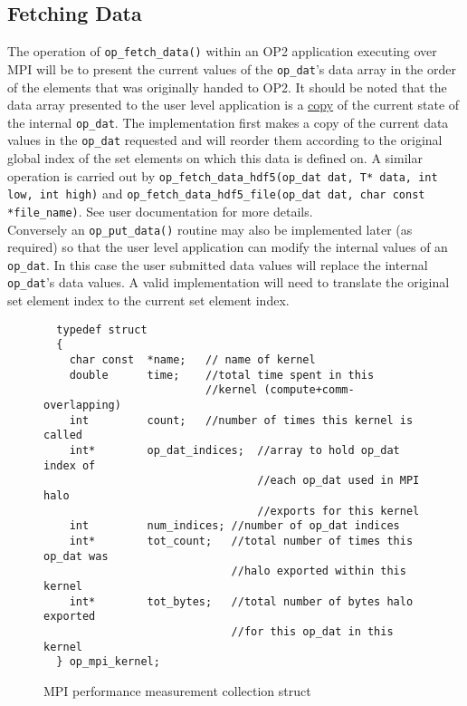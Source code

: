 \documentclass[11pt]{article}
\begin{document}
\subsection{Fetching Data}\label{subsec/putfetch}
The operation of \texttt{op\_fetch\_data()} within an OP2 application executing over MPI will be to present the current
values of the \texttt{op\_dat}'s data array in the order of the elements that was originally handed to OP2. It should be
noted that the data array presented to the user level application is a \underline{copy} of the current state of the
internal \texttt{op\_dat}. The implementation first makes a copy of the current data values in the \texttt{op\_dat}
requested and will reorder them according to the original global index of the set elements on which this data is defined
on. A similar operation is carried out by \texttt{op\_fetch\_data\_hdf5(op\_dat dat, T* data, int low, int high)} and
\texttt{op\_fetch\_data\_hdf5\_file(op\_dat dat, char const *file\_name)}. See user documentation for more details. \\

\noindent Conversely an \texttt{op\_put\_data()} routine may also be implemented later (as required) so that the user
level application can modify the internal values of an \texttt{op\_dat}. In this case the user submitted data values
will replace the internal \texttt{op\_dat}'s data values. A valid implementation will need to translate the original set
element index to the current set element index.

\begin{figure}[t]\small
\begin{verbatim}
  typedef struct
  {
    char const  *name;   // name of kernel
    double      time;    //total time spent in this
                         //kernel (compute+comm-overlapping)
    int         count;   //number of times this kernel is called
    int*        op_dat_indices;  //array to hold op_dat index of
                                 //each op_dat used in MPI halo
                                 //exports for this kernel
    int         num_indices; //number of op_dat indices
    int*        tot_count;   //total number of times this op_dat was
                             //halo exported within this kernel
    int*        tot_bytes;   //total number of bytes halo exported
                             //for this op_dat in this kernel
  } op_mpi_kernel;
\end{verbatim}
\caption{\small MPI performance measurement collection struct}
\normalsize\vspace{-0pt}\label{fig:perf}
\end{figure}
\end{document}

